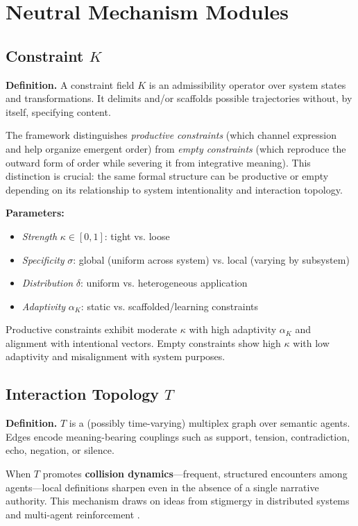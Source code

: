 \documentclass[12pt]{article}
\begin{document}
\section{Neutral Mechanism Modules}
\label{sec:mechanisms}

\subsection{Constraint $K$}

\textbf{Definition.} A constraint field $K$ is an admissibility operator over system states and transformations. It delimits and/or scaffolds possible trajectories without, by itself, specifying content.

The framework distinguishes \textit{productive constraints} (which channel expression and help organize emergent order) from \textit{empty constraints} (which reproduce the outward form of order while severing it from integrative meaning). This distinction is crucial: the same formal structure can be productive or empty depending on its relationship to system intentionality and interaction topology.

\textbf{Parameters:}
\begin{itemize}
\item \textit{Strength} $\kappa \in [0,1]$: tight vs. loose
\item \textit{Specificity} $\sigma$: global (uniform across system) vs. local (varying by subsystem)
\item \textit{Distribution} $\delta$: uniform vs. heterogeneous application
\item \textit{Adaptivity} $\alpha_K$: static vs. scaffolded/learning constraints
\end{itemize}

Productive constraints exhibit moderate $\kappa$ with high adaptivity $\alpha_K$ and alignment with intentional vectors. Empty constraints show high $\kappa$ with low adaptivity and misalignment with system purposes.

\subsection{Interaction Topology $T$}

\textbf{Definition.} $T$ is a (possibly time-varying) multiplex graph over semantic agents. Edges encode meaning-bearing couplings such as support, tension, contradiction, echo, negation, or silence.

When $T$ promotes \textbf{collision dynamics}—frequent, structured encounters among agents—local definitions sharpen even in the absence of a single narrative authority. This mechanism draws on ideas from stigmergy in distributed systems \citep{theraulaz1999brief} and multi-agent reinforcement \citep{shoham2008multiagent}.
\end{document}
